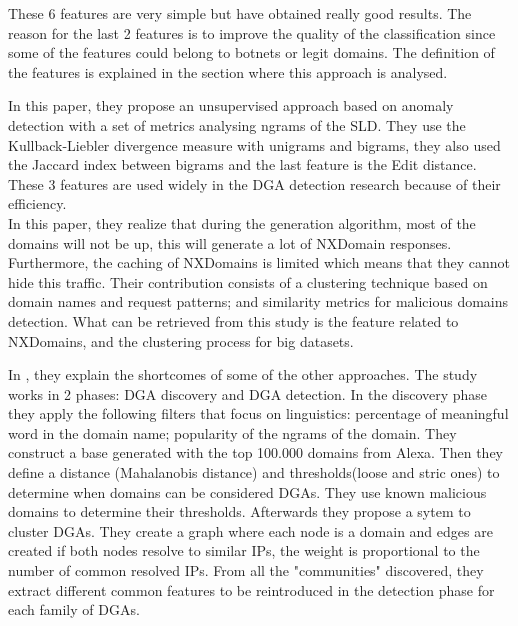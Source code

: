 These 6 features are very simple but have obtained really good results. The reason for the last 2 features is to improve the quality of the classification since some of the features could belong to botnets or legit domains. The definition of the features is explained in the section where this approach is analysed.

In this paper\cite{dga3}, they propose an unsupervised approach based on anomaly detection with a set of metrics analysing ngrams of the SLD. They use the Kullback-Liebler divergence measure with unigrams and bigrams, they also used the Jaccard index between bigrams and the last feature is the Edit distance. These 3 features are used widely in the DGA detection research because of their efficiency. \\

In this paper\cite{dga4}, they realize that during the generation algorithm, most of the domains will not be up, this will generate a lot of NXDomain responses. Furthermore, the caching of NXDomains is limited which means that they cannot hide this traffic. Their contribution consists of a clustering technique based on domain names and request patterns; and similarity metrics for malicious domains detection. What can be retrieved from this study is the feature related to NXDomains, and the clustering process for big datasets.

In \cite{phoenix}, they explain the shortcomes of some of the other approaches. The study works in 2 phases: DGA discovery and DGA detection. In the discovery phase they apply the following filters that focus on linguistics: percentage of meaningful word in the domain name; popularity of the ngrams of the domain. They construct a base generated with the top 100.000 domains from Alexa. Then they define a distance (Mahalanobis distance) and thresholds(loose and stric ones) to determine when domains can be considered DGAs. They use known malicious domains to determine their thresholds. Afterwards they propose a sytem to cluster DGAs. They create a graph where each node is a domain and edges are created if both nodes resolve to similar IPs, the weight is proportional to the number of common resolved IPs. From all the "communities" discovered, they extract different common features to be reintroduced in the detection phase for each family of DGAs.
